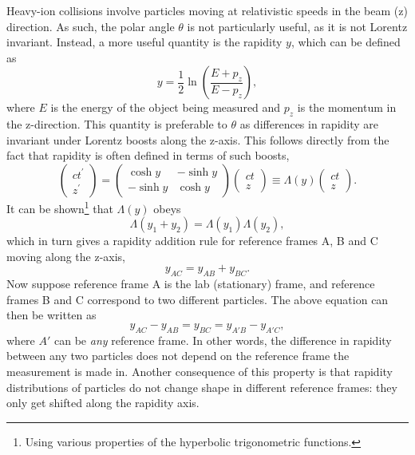 Heavy-ion collisions involve particles moving at relativistic speeds in the beam (z) direction. As such, the polar angle $\theta$ is not particularly useful, as it is not Lorentz invariant. Instead, a more useful quantity is the rapidity $y$, which can be defined as
\begin{equation}
    y = \frac{1}{2} \ln \left( \frac{E + p_{z}}{E - p_{z}} \right),
\end{equation}
where $E$ is the energy of the object being measured and $p_{z}$ is the momentum in the z-direction. This quantity is preferable to $\theta$ as differences in rapidity are invariant under Lorentz boosts along the z-axis. This follows directly from the fact that rapidity is often defined in terms of such boosts,
\begin{equation}
    \left(\begin{array}{c}
        c t^{\prime} \\
        z^{\prime}
        \end{array}\right)=\left(\begin{array}{cc}
        \cosh y & -\sinh y \\
        -\sinh y & \cosh y
        \end{array}\right)\left(\begin{array}{c}
        c t \\
        z
        \end{array}\right) \equiv \Lambda(y)\left(\begin{array}{c}
        c t \\
        z
        \end{array}\right).
\end{equation}
It can be shown\footnote{Using various properties of the hyperbolic trigonometric functions.} that $\Lambda(y)$ obeys
\begin{equation}
    \Lambda(y_1 + y_2) = \Lambda(y_1)\Lambda(y_2),
\end{equation}
which in turn gives a rapidity addition rule for reference frames A, B and C moving along the z-axis,
\begin{equation}
    y_{AC} = y_{AB} + y_{BC}.
\end{equation}
Now suppose reference frame A is the lab (stationary) frame, and reference frames B and C correspond to two different particles. The above equation can then be written as
\begin{equation}
    y_{AC} - y_{AB} = y_{BC} = y_{A'B} - y_{A'C},
\end{equation}
where $A'$ can be \textit{any} reference frame. In other words, the difference in rapidity between any two particles does not depend on the reference frame the measurement is made in. Another consequence of this property is that rapidity distributions of particles do not change shape in different reference frames: they only get shifted along the rapidity axis.

